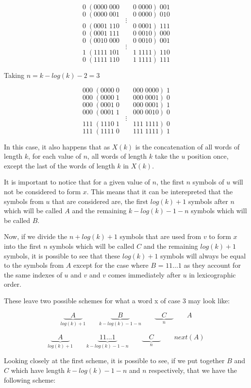 \documentclass[10pt, a4paper]{article}
\theoremstyle{definition}
\begin{document}
$$0\; (0000\; 000 \qquad 0 \;0000 ) \;001$$
$$0\; (0000 \;001 \qquad 0 \;0000 ) \;010$$
$$\vdots$$
$$0\; (0001 \;110 \qquad 0 \;0001 ) \;111$$
$$0\; (0001 \;111 \qquad 0 \;0010 ) \;000$$
$$0\; (0010 \;000 \qquad 0 \;0010 ) \;001$$
$$\vdots$$
$$1\; (1111 \;101 \qquad 1 \;1111 ) \;110$$
$$0\; (1111 \;110 \qquad 1 \;1111 ) \;111$$

Taking $n = k - log(k) - 2 = 3$

$$000\; (0000\; 0 \qquad 000 \;0000 ) \;1$$
$$000\; (0000\; 1 \qquad 000 \;0001 ) \;0$$
$$000\; (0001\; 0 \qquad 000 \;0001 ) \;1$$
$$000\; (0001\; 1 \qquad 000 \;0010 ) \;0$$
$$\vdots$$
$$111\; (1110\; 1 \qquad 111 \;1111 ) \;0$$
$$111\; (1111\; 0 \qquad 111 \;1111 ) \;1$$

In this case, it also happens that as $X(k)$ is the concatenation of all words of length $k$, for each value of $n$, all words of length $k$ take the $u$ position once, except the last of the words of length $k$ in $X(k)$.

It is important to notice that for a given value of $n$, the first $n$ symbols of $u$ will not be considered to form $x$. This means that it can be interepreted that the symbols from  $u$ that are considered are, the first $log(k) + 1$ symbols after $n$ which will be called $A$ and the remaining $k - log(k) - 1 - n$ symbols which will be called $B$.

Now, if we divide the $n + log(k) + 1$ symbols that are used from $v$ to form $x$ into the first $n$ symbols which will be called $C$ and the remaining $log(k) + 1$ symbols, it is possible to see that these $log(k) + 1$ symbols will always be equal to the symbols from $A$ except for the case where $B$ = $11\dots1$ as they account for the same indexes of $u$ and $v$ and $v$ comes immediately after $u$ in lexicographic order. 


These leave two possible schemes for what a word x of case 3 may look like:

$$\underbrace{\quad A \quad }_{log(k) +1} \qquad \underbrace{\quad B \quad }_{k - log(k) - 1 - n}  \qquad \underbrace{\quad C \quad }_{n} \qquad A$$

$$\underbrace{\quad A \quad }_{log(k) +1} \qquad \underbrace{\; 11\dots1 \; }_{k - log(k) - 1 - n}  \qquad \underbrace{\quad C \quad }_{n} \qquad next(A)$$

Looking closely at the first scheme, it is possible to see, if we put together $B$ and $C$ which have length $k - log(k) - 1 - n$ and $n$ respectively, that we have the following scheme:
\end{document}
